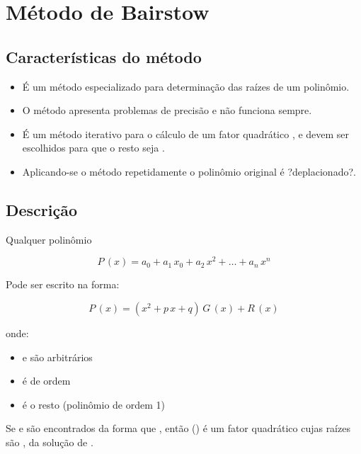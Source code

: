 \section{Método de Bairstow}

\subsection{Características do método}

\begin{itemize}
 \item É um método especializado para determinação das raízes de um polinômio.
 \item O método apresenta problemas de precisão e não funciona sempre.
 \item É um método iterativo para o cálculo de um fator quadrático ,  e  devem ser escolhidos para que o resto seja .
 \item Aplicando-se o método repetidamente o polinômio original é ?deplacionado?.
\end{itemize}

\subsection{Descrição}

Qualquer polinômio

\begin{equation}
 \label{cap1:sec7:eq1}
 P\,(x) = a_0 + a_1 \, x_0 + a_2 \, x^2 + \ldots + a_n \, x^n
\end{equation}
 
Pode ser escrito na forma:

\begin{equation}
 \label{cap1:sec7:eq2}
 P\,(x) = (x^2 + p\,x + q) \, G\,(x) + R\,(x)
\end{equation}

onde:

\begin{itemize}
 \item {} e  são arbitrários
 \item {} é de ordem 
 \item {} é o resto (polinômio de ordem 1)
\end{itemize}

Se  e  são encontrados da forma que , então () é um fator quadrático cujas raízes são ,  da solução de
.

